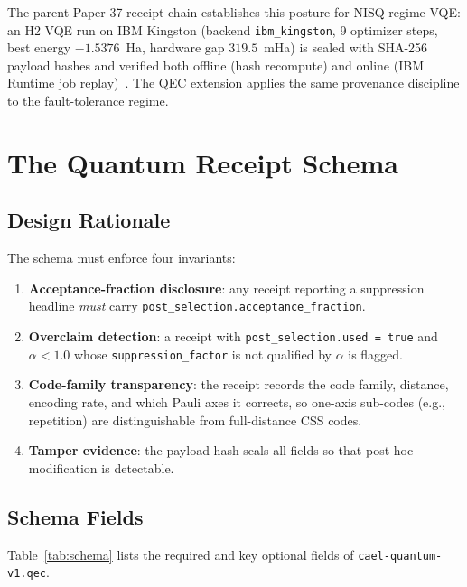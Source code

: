 \documentclass[conference]{IEEEtran}
\newcommand{\af}{\alpha}            %
\begin{document}
The parent Paper 37 receipt chain establishes this posture for
NISQ-regime VQE: an H2 VQE run on IBM Kingston (backend
\texttt{ibm\_kingston}, 9 optimizer steps, best energy $-1.5376$~Ha,
hardware gap $319.5$~mHa) is sealed with SHA-256 payload hashes and
verified both offline (hash recompute) and online (IBM Runtime job
replay)~\cite{paper37-draft}. The QEC extension applies the same
provenance discipline to the fault-tolerance regime.

\section{The Quantum Receipt Schema}
\label{sec:schema}

\subsection{Design Rationale}

The schema must enforce four invariants:

\begin{enumerate}
  \item \textbf{Acceptance-fraction disclosure}: any receipt reporting a
    suppression headline \emph{must} carry \texttt{post\_selection.acceptance\_fraction}.
  \item \textbf{Overclaim detection}: a receipt with
    \texttt{post\_selection.used = true} and $\af < 1.0$ whose
    \texttt{suppression\_factor} is not qualified by $\af$ is flagged.
  \item \textbf{Code-family transparency}: the receipt records the code
    family, distance, encoding rate, and which Pauli axes it corrects, so
    one-axis sub-codes (e.g., repetition) are distinguishable from
    full-distance CSS codes.
  \item \textbf{Tamper evidence}: the payload hash seals all fields so
    that post-hoc modification is detectable.
\end{enumerate}

\subsection{Schema Fields}

Table~\ref{tab:schema} lists the required and key optional fields of
\texttt{cael-quantum-v1.qec}.
\end{document}
